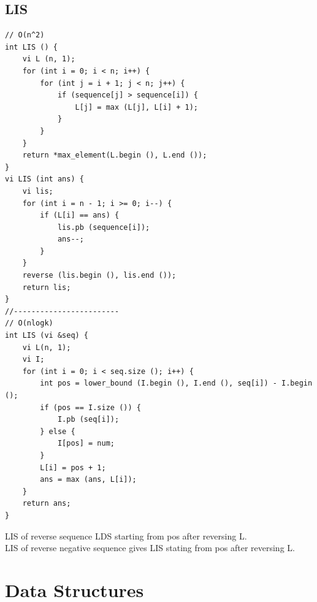 \documentclass[8pt, a4paper, oneside, twocolumn]{extarticle}
\begin{document}
\subsection{LIS}
\begin{verbatim}
// O(n^2)
int LIS () {
    vi L (n, 1);
    for (int i = 0; i < n; i++) {
        for (int j = i + 1; j < n; j++) {
            if (sequence[j] > sequence[i]) {
                L[j] = max (L[j], L[i] + 1);
            }
        }
    }
    return *max_element(L.begin (), L.end ());
}
vi LIS (int ans) {
    vi lis;
    for (int i = n - 1; i >= 0; i--) {
        if (L[i] == ans) {
            lis.pb (sequence[i]);
            ans--;
        }
    }
    reverse (lis.begin (), lis.end ());
    return lis;
}
//------------------------
// O(nlogk)
int LIS (vi &seq) {
    vi L(n, 1);
    vi I;
    for (int i = 0; i < seq.size (); i++) {
        int pos = lower_bound (I.begin (), I.end (), seq[i]) - I.begin ();
        if (pos == I.size ()) {
            I.pb (seq[i]);
        } else {
            I[pos] = num;
        }
        L[i] = pos + 1;
        ans = max (ans, L[i]);
    }
    return ans;
}
\end{verbatim}
LIS of reverse sequence LDS starting from pos after reversing L.\\
LIS of reverse negative sequence gives LIS stating from pos after reversing L.\\

\section{Data Structures}
\end{document}

